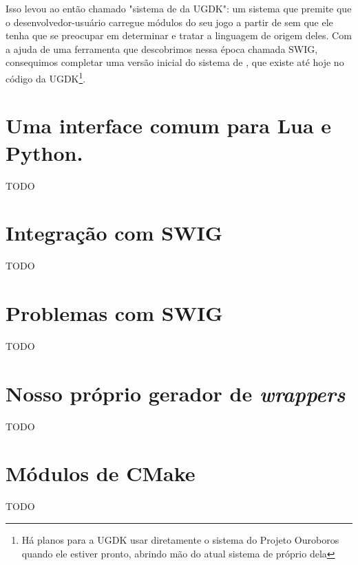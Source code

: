 Isso levou ao então chamado "sistema de  da UGDK": um sistema que
premite que o desenvolvedor-usuário carregue módulos do seu jogo a partir de
 sem que ele tenha que se preocupar em determinar e tratar a linguagem
de origem deles. Com a ajuda de uma ferramenta que descobrimos nessa época
chamada SWIG, consequimos completar uma versão inicial do sistema de ,
que existe até hoje no código da UGDK\footnote{Há planos para a UGDK usar
diretamente o sistema do Projeto Ouroboros quando ele estiver pronto,
abrindo mão do atual sistema de  próprio dela}.

%

\section{Uma interface comum para Lua e Python.}
\label{sec:atividades:opa}

TODO

\section{Integração com SWIG}

TODO

\section{Problemas com SWIG}

TODO

\section{Nosso próprio gerador de \emph{wrappers}}

TODO

\section{Módulos de CMake}

TODO
